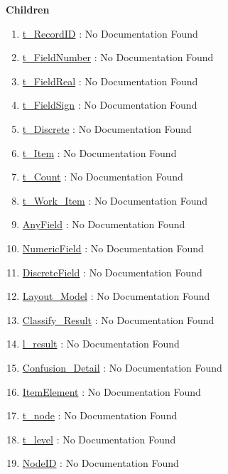 \textbf{Children}
\begin{enumerate}
\item \hyperlink{ecldoc:ml_core.types.t_recordid}{t\_RecordID}
: No Documentation Found
\item \hyperlink{ecldoc:ml_core.types.t_fieldnumber}{t\_FieldNumber}
: No Documentation Found
\item \hyperlink{ecldoc:ml_core.types.t_fieldreal}{t\_FieldReal}
: No Documentation Found
\item \hyperlink{ecldoc:ml_core.types.t_fieldsign}{t\_FieldSign}
: No Documentation Found
\item \hyperlink{ecldoc:ml_core.types.t_discrete}{t\_Discrete}
: No Documentation Found
\item \hyperlink{ecldoc:ml_core.types.t_item}{t\_Item}
: No Documentation Found
\item \hyperlink{ecldoc:ml_core.types.t_count}{t\_Count}
: No Documentation Found
\item \hyperlink{ecldoc:ml_core.types.t_work_item}{t\_Work\_Item}
: No Documentation Found
\item \hyperlink{ecldoc:ml_core.types.anyfield}{AnyField}
: No Documentation Found
\item \hyperlink{ecldoc:ml_core.types.numericfield}{NumericField}
: No Documentation Found
\item \hyperlink{ecldoc:ml_core.types.discretefield}{DiscreteField}
: No Documentation Found
\item \hyperlink{ecldoc:ml_core.types.layout_model}{Layout\_Model}
: No Documentation Found
\item \hyperlink{ecldoc:ml_core.types.classify_result}{Classify\_Result}
: No Documentation Found
\item \hyperlink{ecldoc:ml_core.types.l_result}{l\_result}
: No Documentation Found
\item \hyperlink{ecldoc:ml_core.types.confusion_detail}{Confusion\_Detail}
: No Documentation Found
\item \hyperlink{ecldoc:ml_core.types.itemelement}{ItemElement}
: No Documentation Found
\item \hyperlink{ecldoc:ml_core.types.t_node}{t\_node}
: No Documentation Found
\item \hyperlink{ecldoc:ml_core.types.t_level}{t\_level}
: No Documentation Found
\item \hyperlink{ecldoc:ml_core.types.nodeid}{NodeID}
: No Documentation Found
\end{enumerate}

